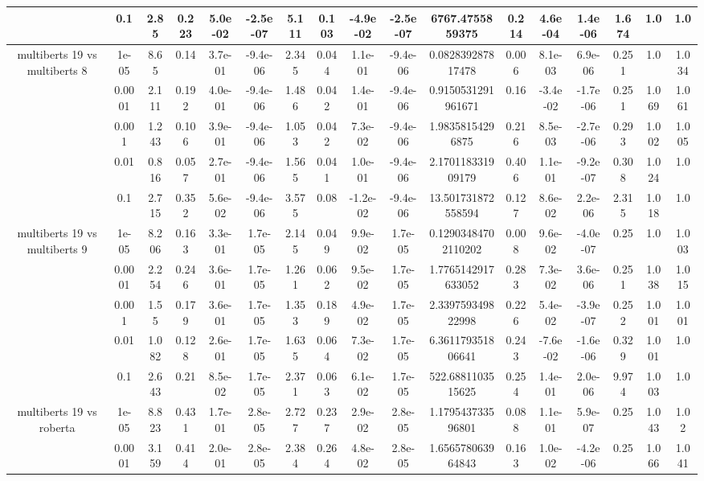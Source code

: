 \begin{tabular}{|c|c|c|c|c|c|c|c|c|c|c|c|c|c|c|c|c|}
 & 0.1 & 2.85 & 0.223 & 5.0e-02 & -2.5e-07 & 5.111 & 0.103 & -4.9e-02 & -2.5e-07 & 6767.4755859375 & 0.214 & 4.6e-04 & 1.4e-06 & 1.674 & 1.0 & 1.0 \\
\hline
\multirow{5}{*}{multiberts 19 vs multiberts 8} & 1e-05 & 8.65 & 0.14 & 3.7e-01 & -9.4e-06 & 2.345 & 0.044 & 1.1e-01 & -9.4e-06 & 0.082839287817478 & 0.006 & 8.1e-03 & 6.9e-06 & 0.251 & 1.0 & 1.034 \\
 & 0.0001 & 2.111 & 0.192 & 4.0e-01 & -9.4e-06 & 1.486 & 0.042 & 1.4e-01 & -9.4e-06 & 0.9150531291961671 & 0.16 & -3.4e-02 & -1.7e-06 & 0.251 & 1.069 & 1.061 \\
 & 0.001 & 1.243 & 0.106 & 3.9e-01 & -9.4e-06 & 1.053 & 0.042 & 7.3e-02 & -9.4e-06 & 1.98358154296875 & 0.216 & 8.5e-03 & -2.7e-06 & 0.293 & 1.002 & 1.005 \\
 & 0.01 & 0.816 & 0.057 & 2.7e-01 & -9.4e-06 & 1.565 & 0.041 & 1.0e-01 & -9.4e-06 & 2.170118331909179 & 0.406 & 1.1e-01 & -9.2e-07 & 0.308 & 1.024 & 1.0 \\
 & 0.1 & 2.715 & 0.352 & 5.6e-02 & -9.4e-06 & 3.575 & 0.08 & -1.2e-02 & -9.4e-06 & 13.501731872558594 & 0.127 & 8.6e-02 & 2.2e-06 & 2.315 & 1.018 & 1.0 \\
\hline
\multirow{5}{*}{multiberts 19 vs multiberts 9} & 1e-05 & 8.206 & 0.163 & 3.3e-01 & 1.7e-05 & 2.145 & 0.049 & 9.9e-02 & 1.7e-05 & 0.12903484702110202 & 0.008 & 9.6e-02 & -4.0e-07 & 0.25 & 1.0 & 1.003 \\
 & 0.0001 & 2.254 & 0.246 & 3.6e-01 & 1.7e-05 & 1.261 & 0.062 & 9.5e-02 & 1.7e-05 & 1.7765142917633052 & 0.283 & 7.3e-02 & 3.6e-06 & 0.251 & 1.038 & 1.015 \\
 & 0.001 & 1.55 & 0.179 & 3.6e-01 & 1.7e-05 & 1.353 & 0.189 & 4.9e-02 & 1.7e-05 & 2.339759349822998 & 0.226 & 5.4e-02 & -3.9e-07 & 0.252 & 1.001 & 1.001 \\
 & 0.01 & 1.082 & 0.128 & 2.6e-01 & 1.7e-05 & 1.635 & 0.064 & 7.3e-02 & 1.7e-05 & 6.361179351806641 & 0.243 & -7.6e-02 & -1.6e-06 & 0.329 & 1.001 & 1.0 \\
 & 0.1 & 2.643 & 0.21 & 8.5e-02 & 1.7e-05 & 2.371 & 0.063 & 6.1e-02 & 1.7e-05 & 522.6881103515625 & 0.254 & 1.4e-01 & 2.0e-06 & 9.974 & 1.003 & 1.0 \\
\hline
\multirow{5}{*}{multiberts 19 vs roberta } & 1e-05 & 8.823 & 0.431 & 1.7e-01 & 2.8e-05 & 2.727 & 0.237 & 2.9e-02 & 2.8e-05 & 1.179543733596801 & 0.088 & 1.1e-01 & 5.9e-07 & 0.25 & 1.043 & 1.02 \\
 & 0.0001 & 3.159 & 0.414 & 2.0e-01 & 2.8e-05 & 2.384 & 0.264 & 4.8e-02 & 2.8e-05 & 1.656578063964843 & 0.163 & 1.0e-02 & -4.2e-06 & 0.25 & 1.066 & 1.041 \\

\end{tabular}

